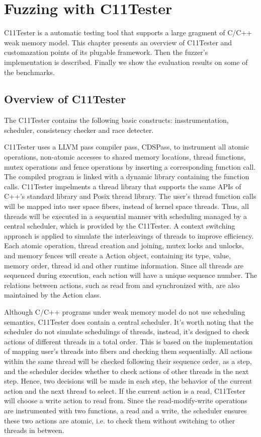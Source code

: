 \chapter{\label{cha:c11tester}Fuzzing with C11Tester}

C11Tester is a automatic testing tool that supports a large gragment of C/C++ weak memory model. This chapter presents an overview of C11Tester and customazation points of its plugable framework. Then the fuzzer's implementation is described. Finally we show the evaluation results on some of the benchmarks.

\section{Overview of C11Tester}

The C11Tester contains the following basic constructs: insstrumentation, scheduler, consistency checker and race detecter. 

C11Tester uses a LLVM pass compiler pass, CDSPass, to instrument all atomic operations, non-atomic accesses to shared memory locations, thread functions, mutex operations and fence operations by inserting a corresponding function call. The compiled program is linked with a dynamic library containing the function calls. 
C11Tester impelments a thread library that supports the same APIs of C++'s standard library and Posix thread library. The user's thread function calls will be mapped into user space fibers, instead of kernel space threads. Thus, all threads will be executed in a sequential manner with scheduling managed by a central scheduler, which is provided by the C11Tester. A context switching approach is applied to simulate the interleavings of threads to improve efficiency. 
Each atomic operation, thread creation and joining, mutex locks and unlocks, and memory fences will create a Action object, containing its type, value, memory order, thread id and other runtime information. Since all threads are sequenced during execution, each action will have a unique sequence number. The relations between actions, such as read from and synchronized with, are also maintained by the Action class. 

Although C/C++ programs under weak memory model do not use scheduling semantics, C11Tester does contain a central scheduler. It's worth noting that the scheduler do not simulate schedulings of threads, instead, it's designed to check actions of different threads in a total order. This is based on the implementation of mapping user's threads into fibers and checking them sequentially. All actions within the same thread will be checked following their sequence order, as a step, and the scheduler decides whether to check actions of other threads in the next step. Hence, two decisions will be made in each step, the behavior of the current action and the next thread to select. If the current action is a read, C11Tester will choose a write action to read from. Since the read-modify-write operations are instrumented with two functions, a read and a write, the scheduler ensures these two actions are atomic, i.e. to check them without switching to other threads in between. 

